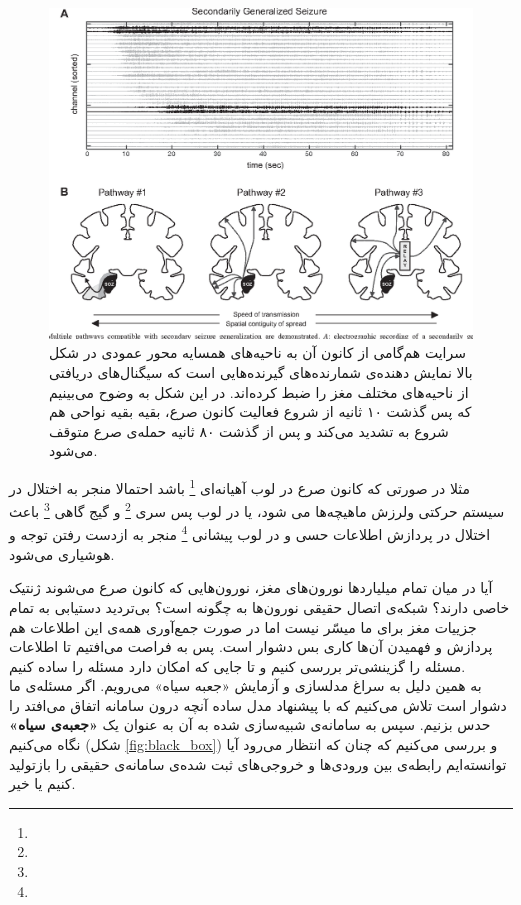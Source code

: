 \begin{figure}
	\centering
	\includegraphics[width=\textwidth]{../Figures/generalized_seizure.png}
	\caption{
		سرایت هم‌گامی از کانون آن به ناحیه‌های همسایه 
		\cite{Tomlinson2017SecondaryGO}
		محور عمودی در شکل بالا نمایش دهنده‌ی شمارنده‌های گیرنده‌هایی است که سیگنال‌های دریافتی از ناحیه‌های مختلف مغز را ضبط کرده‌اند. در این شکل به وضوح می‌بینیم که پس گذشت ۱۰ ثانیه از شروع فعالیت کانون صرع، بقیه بقیه نواحی هم شروع به تشدید می‌کند و پس از گذشت ۸۰ ثانیه حمله‌ی صرع متوقف می‌شود.
	}
\end{figure}

مثلا در صورتی که کانون صرع در لوب آهیانه‌ای 
\footnote{
}
باشد احتمالا منجر به اختلال در سیستم حرکتی ولرزش ماهیچه‌ها می شود، یا در لوب پس سری
\footnote{
}
 و گیج گاهی
\footnote{
}
  باعث اختلال در پردازش اطلاعات حسی و در لوب پیشانی
\footnote{
}
   منجر به ازدست رفتن توجه و هوشیاری می‌شود.

آیا در میان تمام میلیاردها نورون‌های مغز، نورون‌هایی که کانون صرع می‌شوند ژنتیک خاصی دارند؟ شبکه‌ی اتصال حقیقی نورون‌ها به چگونه است؟ بی‌تردید دستیابی به تمام جزییات مغز برای ما میسّر نیست اما در صورت جمع‌آوری همه‌ی این اطلاعات هم پردازش و فهمیدن آن‌ها کاری بس دشوار است. پس به فراصت می‌افتیم تا اطلاعات مسئله را گزینشی‌تر بررسی کنیم و تا جایی که امکان دارد مسئله را ساده کنیم.\\

به همین دلیل به سراغ مدلسازی و آزمایش «جعبه سیاه» می‌رویم. اگر مسئله‌ی ما دشوار است تلاش می‌کنیم که با پیشنهاد مدل ساده‌ آنچه درون سامانه اتفاق می‌افتد را حدس بزنیم. سپس به سامانه‌ی شبیه‌سازی شده به آن به عنوان یک \textbf{«جعبه‌ی سیاه»} نگاه می‌کنیم (شکل 
\ref{fig:black_box})
 و بررسی می‌کنیم که چنان که انتظار می‌رود آیا توانسته‌ایم رابطه‌ی بین ورودی‌ها و خروجی‌های ثبت شده‌ی سامانه‌ی حقیقی را بازتولید کنیم یا خیر.\\

